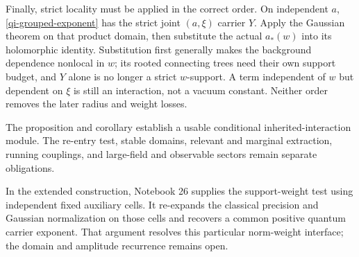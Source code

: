 Finally, strict locality must be applied in the correct order.
On independent $a$, \eqref{qi-grouped-exponent} has the strict
joint $(a,\xi)$ carrier $Y$. Apply the Gaussian theorem on that
product domain, then substitute the actual $a_*(w)$ into its
holomorphic identity. Substitution first generally makes the
background dependence nonlocal in $w$; its rooted connecting
trees need their own support budget, and $Y$ alone is no
longer a strict $w$-support. A term independent of $w$ but
dependent on $\xi$ is still an interaction, not a vacuum
constant. Neither order removes the later radius and weight
losses.

The proposition and corollary establish a usable conditional
inherited-interaction module. The re-entry test, stable domains,
relevant and marginal extraction, running couplings, and
large-field and observable sectors remain separate obligations.

In the extended construction, Notebook 26 supplies the support-weight
test using independent fixed auxiliary cells. It re-expands the
classical precision and Gaussian normalization on those cells
and recovers a common positive quantum carrier exponent.
That argument resolves this particular norm-weight interface;
the domain and amplitude recurrence remains open.
